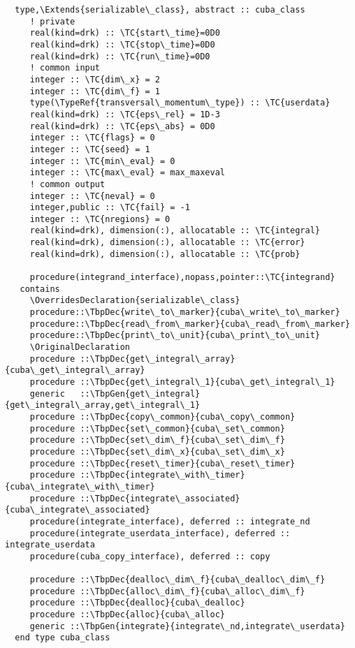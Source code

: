 \begin{Verbatim}
  type,\Extends{serializable\_class}, abstract :: cuba_class  
     ! private
     real(kind=drk) :: \TC{start\_time}=0D0
     real(kind=drk) :: \TC{stop\_time}=0D0
     real(kind=drk) :: \TC{run\_time}=0D0
     ! common input
     integer :: \TC{dim\_x} = 2
     integer :: \TC{dim\_f} = 1
     type(\TypeRef{transversal\_momentum\_type}) :: \TC{userdata}
     real(kind=drk) :: \TC{eps\_rel} = 1D-3
     real(kind=drk) :: \TC{eps\_abs} = 0D0
     integer :: \TC{flags} = 0
     integer :: \TC{seed} = 1
     integer :: \TC{min\_eval} = 0
     integer :: \TC{max\_eval} = max_maxeval
     ! common output
     integer :: \TC{neval} = 0
     integer,public :: \TC{fail} = -1
     integer :: \TC{nregions} = 0
     real(kind=drk), dimension(:), allocatable :: \TC{integral}
     real(kind=drk), dimension(:), allocatable :: \TC{error}
     real(kind=drk), dimension(:), allocatable :: \TC{prob}

     procedure(integrand_interface),nopass,pointer::\TC{integrand}
   contains
     \OverridesDeclaration{serializable\_class}
     procedure::\TbpDec{write\_to\_marker}{cuba\_write\_to\_marker}
     procedure::\TbpDec{read\_from\_marker}{cuba\_read\_from\_marker}
     procedure::\TbpDec{print\_to\_unit}{cuba\_print\_to\_unit}
     \OriginalDeclaration
     procedure ::\TbpDec{get\_integral\_array}{cuba\_get\_integral\_array}
     procedure ::\TbpDec{get\_integral\_1}{cuba\_get\_integral\_1}
     generic   ::\TbpGen{get\_integral}{get\_integral\_array,get\_integral\_1}
     procedure ::\TbpDec{copy\_common}{cuba\_copy\_common}
     procedure ::\TbpDec{set\_common}{cuba\_set\_common}
     procedure ::\TbpDec{set\_dim\_f}{cuba\_set\_dim\_f}
     procedure ::\TbpDec{set\_dim\_x}{cuba\_set\_dim\_x}
     procedure ::\TbpDec{reset\_timer}{cuba\_reset\_timer}
     procedure ::\TbpDec{integrate\_with\_timer}{cuba\_integrate\_with\_timer}
     procedure ::\TbpDec{integrate\_associated}{cuba\_integrate\_associated}
     procedure(integrate_interface), deferred :: integrate_nd
     procedure(integrate_userdata_interface), deferred :: integrate_userdata
     procedure(cuba_copy_interface), deferred :: copy

     procedure ::\TbpDec{dealloc\_dim\_f}{cuba\_dealloc\_dim\_f}
     procedure ::\TbpDec{alloc\_dim\_f}{cuba\_alloc\_dim\_f}
     procedure ::\TbpDec{dealloc}{cuba\_dealloc}
     procedure ::\TbpDec{alloc}{cuba\_alloc}
     generic ::\TbpGen{integrate}{integrate\_nd,integrate\_userdata}
  end type cuba_class
\end{Verbatim}
